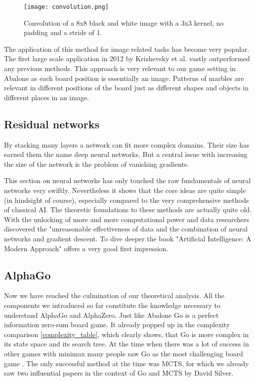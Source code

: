\begin{figure}
    \centering
    \texttt{[image: convolution.png]}
    \caption{Convolution of a 8x8 black and white image with a 3x3 kernel, no padding and a stride of 1. \cite{bruasdal_deep_2020}}
    \label{convolution}
\end{figure}


The application of this method for image related tasks has become very popular. The first large scale application in 2012 by Krizhevsky et al. \cite{krizhevsky_imagenet_2017} vastly outperformed any previous methods. This approach is very relevant to our game setting in Abalone as each board position is essentially an image. Patterns of marbles are relevant in different positions of the board just as different shapes and objects in different places in an image.

\subsection{Residual networks}
By stacking many layers a network can fit more complex domains. Their size has earned them the name deep neural networks. But a central issue with increasing the size of the network is the problem of vanishing gradients.

This section on neural networks has only touched the raw fundamentals of neural networks very swiftly. Nevertheless it shows that the core ideas are quite simple (in hindsight of course), especially compared to the very comprehensive methods of classical AI. The theoretic foundations to these methods are actually quite old. With the unlocking of more and more computational power and data researchers discovered the "unreasonable effectiveness of data \cite{halevy_unreasonable_2009} and the combination of neural networks and gradient descent. To dive deeper the book "Artificial Intelligence: A Modern Approach" \cite{russell_artificial_2021} offers a very good first impression.

\subsection{AlphaGo}
Now we have reached the culmination of our theoretical analysis. All the components we introduced so far constitute the knowledge necessary to understand AlphaGo and AlphaZero. Just like Abalone Go is a perfect information zero-sum board game. It already popped up in the complexity comparison \ref{complexity_table}, which clearly shows, that Go is more complex in its state space and its search tree. At the time when there was a lot of success in other games with minimax many people saw Go as the most challenging board game \cite{muller_computer_2002}. The only successful method at the time was MCTS, for which we already saw two influential papers in the context of Go and MCTS by David Silver.

